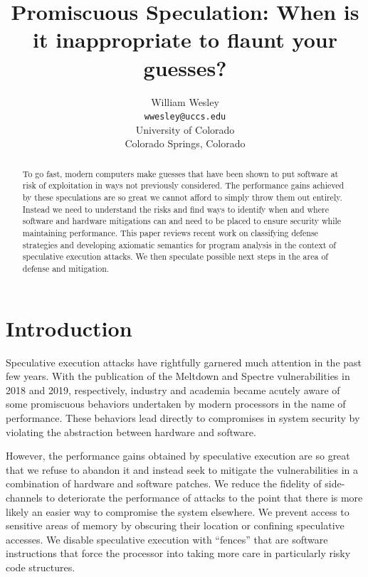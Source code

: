 \documentclass[11pt,conference]{IEEEtran}
\title{Promiscuous Speculation: When is it inappropriate to flaunt your guesses?}
\author{William Wesley \\
\texttt{wwesley@uccs.edu} \\
University of Colorado \\
Colorado Springs, Colorado}
\begin{document}
\maketitle

\begin{abstract}
	To go fast, modern computers make guesses that have been shown to put software at risk of exploitation in ways not previously considered.
	The performance gains achieved by these speculations are so great we cannot afford to simply throw them out entirely.
	Instead we need to understand the risks and find ways to identify when and where software and hardware mitigations can and need to be placed to ensure security while maintaining performance.
	This paper reviews recent work on classifying defense strategies and developing axiomatic semantics for program analysis in the context of speculative execution attacks.
	We then speculate possible next steps in the area of defense and mitigation.
\end{abstract}

\section{Introduction}

Speculative execution attacks have rightfully garnered much attention in the past few years.
With the publication of the Meltdown\cite{meltdown} and Spectre\cite{spectre} vulnerabilities in 2018 and 2019, respectively, industry and academia became acutely aware of some promiscuous behaviors undertaken by modern processors in the name of performance.
These behaviors lead directly to compromises in system security by violating the abstraction between hardware and software.

However, the performance gains obtained by speculative execution are so great that we refuse to abandon it and instead seek to mitigate the vulnerabilities in a combination of hardware and software patches.
We reduce the fidelity of side-channels to deteriorate the performance of attacks to the point that there is more likely an easier way to compromise the system elsewhere.
We prevent access to sensitive areas of memory by obscuring their location or confining speculative accesses.
We disable speculative execution with ``fences'' that are software instructions that force the processor into taking more care in particularly risky code structures.
\end{document}
